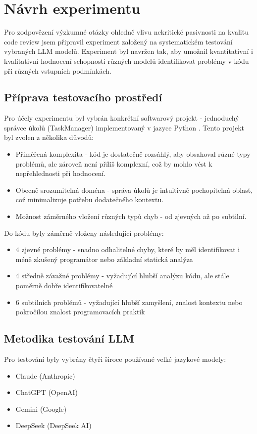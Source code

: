\documentclass[12pt, a4paper]{article}
\begin{document}
\section{Návrh experimentu}

Pro zodpovězení výzkumné otázky ohledně vlivu nekritické pasivnosti na kvalitu code review jsem připravil experiment založený na systematickém testování vybraných LLM modelů. Experiment byl navržen tak, aby umožnil kvantitativní i kvalitativní hodnocení schopnosti různých modelů identifikovat problémy v kódu při různých vstupních podmínkách.

\subsection{Příprava testovacího prostředí}
Pro účely experimentu byl vybrán konkrétní softwarový projekt - jednoduchý správce úkolů (TaskManager) implementovaný v jazyce Python \cite{pospisil2025}. Tento projekt byl zvolen z několika důvodů:

\begin{itemize}
  \item Přiměřená komplexita - kód je dostatečně rozsáhlý, aby obsahoval různé typy problémů, ale zároveň není příliš komplexní, což by mohlo vést k nepřehlednosti při hodnocení.
  \item Obecně srozumitelná doména - správa úkolů je intuitivně pochopitelná oblast, což minimalizuje potřebu dodatečného kontextu.
  \item Možnost záměrného vložení různých typů chyb - od zjevných až po subtilní.
\end{itemize}

Do kódu byly záměrně vloženy následující problémy:
\begin{itemize}
  \item 4 zjevné problémy - snadno odhalitelné chyby, které by měl identifikovat i méně zkušený programátor nebo základní statická analýza
  \item 4 středně závažné problémy - vyžadující hlubší analýzu kódu, ale stále poměrně dobře identifikovatelné
  \item 6 subtilních problémů - vyžadující hlubší zamyšlení, znalost kontextu nebo pokročilou znalost programovacích praktik
\end{itemize}

\subsection{Metodika testování LLM}
Pro testování byly vybrány čtyři široce používané velké jazykové modely:
\begin{itemize}
  \item Claude (Anthropic) \cite{claude2025}
  \item ChatGPT (OpenAI) \cite{chatgpt2025}
  \item Gemini (Google) \cite{gemini2025}
  \item DeepSeek (DeepSeek AI) \cite{deepseek2025}
\end{itemize}
\end{document}
